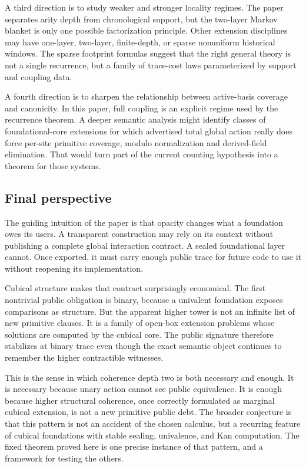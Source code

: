 A third direction is to study weaker and stronger locality regimes.  The paper separates arity
depth from chronological support, but the two-layer Markov blanket is only one possible
factorization principle.  Other extension disciplines may have one-layer, two-layer,
finite-depth, or sparse nonuniform historical windows.  The sparse footprint formulas suggest
that the right general theory is not a single recurrence, but a family of trace-cost laws
parameterized by support and coupling data.

A fourth direction is to sharpen the relationship between active-basis coverage and
canonicity.  In this paper, full coupling is an explicit regime used by the recurrence theorem.
A deeper semantic analysis might identify classes of foundational-core extensions for which
advertised total global action really does force per-site primitive coverage, modulo
normalization and derived-field elimination.  That would turn part of the current counting
hypothesis into a theorem for those systems.

\subsection{Final perspective}
\label{subsec:conclusion-final-perspective}

The guiding intuition of the paper is that opacity changes what a foundation owes its users.
A transparent construction may rely on its context without publishing a complete global
interaction contract.  A sealed foundational layer cannot.  Once exported, it must carry enough
public trace for future code to use it without reopening its implementation.

Cubical structure makes that contract surprisingly economical.  The first nontrivial public
obligation is binary, because a univalent foundation exposes comparisons as structure.  But the
apparent higher tower is not an infinite list of new primitive clauses.  It is a family of
open-box extension problems whose solutions are computed by the cubical core.  The public
signature therefore stabilizes at binary trace even though the exact semantic object continues
to remember the higher contractible witnesses.

This is the sense in which coherence depth two is both necessary and enough.  It is necessary
because unary action cannot see public equivalence.  It is enough because higher structural
coherence, once correctly formulated as marginal cubical extension, is not a new primitive
public debt.  The broader conjecture is that this pattern is not an accident of the chosen
calculus, but a recurring feature of cubical foundations with stable sealing, univalence, and
Kan computation.  The fixed theorem proved here is one precise instance of that pattern, and a
framework for testing the others.
